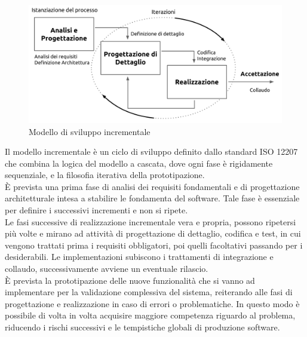 	\begin{figure}[H]
		\centering
	   	\includegraphics[width=1\textwidth]{immagini/modello_incrementale}
	   	\caption{Modello di sviluppo incrementale}
	\end{figure}
	
	Il modello incrementale è un ciclo di sviluppo definito dallo standard ISO 12207 che combina la logica del modello a cascata, dove ogni fase è rigidamente sequenziale, e la filosofia iterativa della prototipazione.\\
	
	È prevista una prima fase di analisi dei requisiti fondamentali e di progettazione architetturale intesa a stabilire le fondamenta del software. Tale fase è essenziale per definire i successivi incrementi e non si ripete.\\
	
	Le fasi successive di realizzazione incrementale vera e propria, possono ripetersi più volte e mirano ad attività di progettazione di dettaglio, codifica e test, in cui vengono trattati prima i requisiti obbligatori, poi quelli facoltativi passando per i desiderabili. Le implementazioni subiscono i trattamenti di integrazione e collaudo, successivamente avviene un eventuale rilascio.\\

	È prevista la prototipazione delle nuove funzionalità che si vanno ad implementare per la validazione complessiva del sistema, reiterando 
	alle fasi di progettazione e realizzazione in caso di errori o problematiche. In questo modo è possibile di volta in volta acquisire maggiore competenza riguardo al problema, riducendo i rischi successivi e le tempistiche globali di produzione software.
	
	
